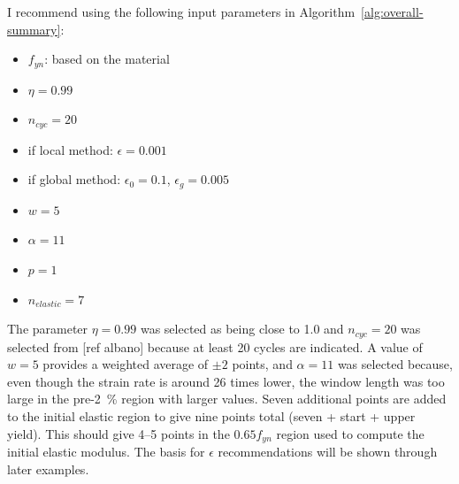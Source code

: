 \documentclass[a4paper,11pt]{article}
\begin{document}
I recommend using the following input parameters in Algorithm~\ref{alg:overall-summary}:
\begin{itemize}
    \item $f_{yn}$: based on the material
    \item $\eta = 0.99$
    \item $n_{cyc} = 20$
    \item if local method: $\epsilon = 0.001$
    \item if global method: $\epsilon_0 = 0.1$, $\epsilon_g = 0.005$
    \item $w = 5$
    \item $\alpha = 11$
    \item $p = 1$
    \item $n_{elastic} = 7$
\end{itemize}
The parameter $\eta = 0.99$ was selected as being close to 1.0 and $n_{cyc} = 20$ was selected from [ref albano] because at least 20 cycles are indicated.
A value of $w = 5$ provides a weighted average of $\pm2$ points, and $\alpha = 11$ was selected because, even though the strain rate is around 26 times lower, the window length was too large in the pre-2~\% region with larger values.
Seven additional points are added to the initial elastic region to give nine points total (seven + start + upper yield).
This should give 4--5 points in the $0.65 f_{yn}$ region used to compute the initial elastic modulus.
The basis for $\epsilon$ recommendations will be shown through later examples.
\end{document}
